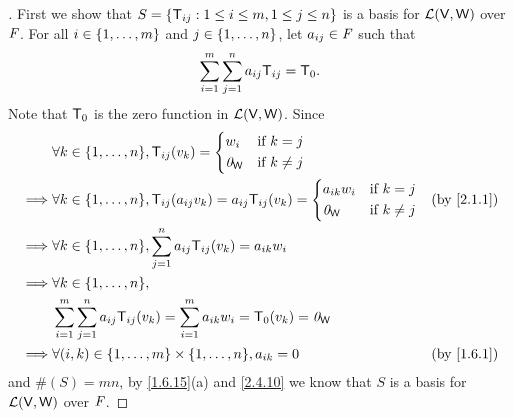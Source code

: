 \begin{proof}[]
	First we show that \(S = \left\lbrace\mathsf{T}_{i j} : 1 \leq i \leq m, 1 \leq j \leq n\right\rbrace\) is a basis for \(\mathcal{L}(\mathsf{V}, \mathsf{W})\) over \(\mathit{F}\).
	For all \(i \in \left\lbrace1, \dots, m\right\rbrace\) and \(j \in \left\lbrace1, \dots, n\right\rbrace\), let \(a_{i j} \in \mathit{F}\) such that
	\[
		\sum_{i = 1}^m \sum_{j = 1}^n a_{i j} \mathsf{T}_{i j} = \mathsf{T}_0.
	\]
	Note that \(\mathsf{T}_0\) is the zero function in \(\mathcal{L}(\mathsf{V}, \mathsf{W})\).
	Since
	\begin{align*}
		         & \forall k \in \set{1, \dots, n}, \T_{i j}(v_k) = \begin{dcases}
			                                                            w_i      & \text{if } k = j    \\
			                                                            \zv_{\W} & \text{if } k \neq j
		                                                            \end{dcases}                                        \\
		\implies & \forall k \in \set{1, \dots, n}, \T_{i j}(a_{i j} v_k) = a_{i j} \T_{i j}(v_k) = \begin{dcases}
			                                                                                            a_{i k} w_i & \text{if } k = j    \\
			                                                                                            \zv_{\W}    & \text{if } k \neq j
		                                                                                            \end{dcases}        &  & \by{2.1.1}   \\
		\implies & \forall k \in \set{1, \dots, n}, \sum_{j = 1}^n a_{i j} \T_{i j}(v_k) = a_{i k} w_i                                    \\
		\implies & \forall k \in \set{1, \dots, n},                                                                                       \\
		         & \sum_{i = 1}^m \sum_{j = 1}^n a_{i j} \T_{i j}(v_k) = \sum_{i = 1}^m a_{i k} w_i = \zT(v_k) = \zv_{\W}                 \\
		\implies & \forall (i, k) \in \set{1, \dots, m} \times \set{1, \dots, n}, a_{i k} = 0                             &  & \by{1.6.1}
	\end{align*}
	and \(\#(S) = mn\), by \cref{1.6.15}(a) and \cref{2.4.10} we know that \(S\) is a basis for \(\mathcal{L}(\mathsf{V}, \mathsf{W})\) over \(\mathit{F}\).


\end{proof}

